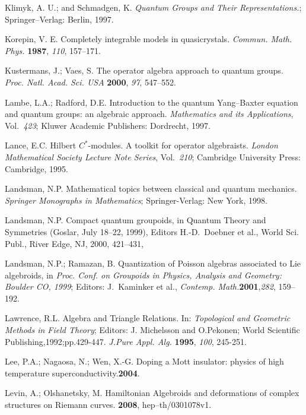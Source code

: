 \documentclass[12pt]{article}
\theoremstyle{plain}
\theoremstyle{definition}
\numberwithin{equation}{section}
\begin{document}
\begin{thebibliography}{199}
Klimyk, A. U.; and Schmadgen, K. {\em  Quantum Groups and Their Representations.}; Springer--Verlag: Berlin, 1997.

Korepin, V. E.  Completely integrable models in quasicrystals. {\em Commun. Math. Phys.}  {\bf 1987}, {\em 110}, 157--171.

Kustermans, J.; Vaes, S. The operator algebra approach to quantum groups. {\em Proc. Natl. Acad. Sci. USA} {\bf 2000}, {\em 97}, 547--552.

Lambe, L.A.; Radford, D.E.  Introduction to the quantum Yang--Baxter equation and quantum groups: an algebraic approach. \emph{Mathematics and its Applications}, Vol.~{\em 423}; Kluwer Academic Publishers: Dordrecht, 1997.

Lance, E.C.  Hilbert $C^*$-modules. A toolkit for operator algebraists.  {\em London Mathematical Society Lecture Note Series}, Vol.~{\em 210}; Cambridge University Press: Cambridge, 1995.

Landsman, N.P.  Mathematical topics between classical and quantum mechanics. {\em Springer Monographs in Mathematics}; Springer-Verlag: New York, 1998.

Landsman, N.P.  Compact quantum groupoids, in  Quantum Theory and Symmetries (Goslar,  July 18--22, 1999), Editors H.-D.~Doebner et al., World Sci. Publ., River Edge, NJ, 2000, 421--431, 

Landsman, N.P.; Ramazan, B. Quantization of Poisson algebras associated to Lie algebroids, in {\em Proc. Conf. on Groupoids in Physics, Analysis and Geometry: Boulder CO, 1999}; Editors: J.~Kaminker et al., \emph{Contemp. Math.}{\bf 2001},{\em 282}, 159--192.  

Lawrence, R.L. Algebra and Triangle Relations. In: {\em Topological and Geometric Methods in Field Theory}; Editors: J. Michelsson and O.Pekonen; World Scientific Publishing,1992;pp.429-447. {\em J.Pure Appl. Alg.} {\bf 1995}, {\em 100}, 245-251.

Lee, P.A.; Nagaosa, N.; Wen, X.-G.  Doping a Mott insulator: physics of high temperature superconductivity.{\bf 2004}. 

Levin, A.; Olshanetsky, M.  Hamiltonian Algebroids and deformations of complex structures on Riemann curves. {\bf 2008}, hep--th/0301078v1.


\end{thebibliography}
\end{document}

